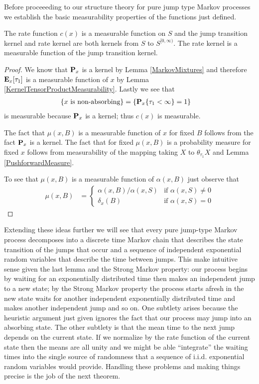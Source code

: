 Before proceeeding to our structure theory for pure jump type Markov
processes we establish the basic measurability properties of the
functions just defined.
\begin{lem}\label{MeasurabilityRateKernel}The rate function $c(x)$ is a measurable function on $S$
  and the jump transition kernel and rate kernel are both kernels from
  $S$ to $S^{[0,\infty)}$.  The rate kernel is a measurable function
  of the jump transition kernel.
\end{lem}
\begin{proof}
We know that $\probabilityop_x$ is a kernel by Lemma
\ref{MarkovMixtures} and therefore $\sexpectation{\tau_1}{x}$ is a
measurable function of $x$ by Lemma
\ref{KernelTensorProductMeasurability}.  Lastly we see that 
\begin{align*}
\lbrace x \text{ is non-absorbing} \rbrace &= \lbrace \sprobability{\tau_1 <
  \infty}{x} = 1 \rbrace
\end{align*}
is measurable because $\probabilityop_x$ is a kernel; thus $c(x)$ is measurable.

The fact that $\mu(x,B)$ is a measurable function of $x$ for fixed $B$
follows from the fact $\probabilityop_x$ is a kernel.  The fact that
for fixed $\mu(x,B)$ is a probability measure for fixed $x$ follows
from measurability of the mapping taking $X$ to $\theta_{\tau_1}X$ and
Lemma \ref{PushforwardMeasure}.

To see that $\mu(x,B)$ is a measurable function of $\alpha(x,B)$ just
observe that 
\begin{align*}
\mu(x,B) &= \begin{cases}
\alpha(x,B)/\alpha(x, S) & \text{if $\alpha(x, S)
  \neq 0$} \\
\delta_x(B) & \text{if $\alpha(x, S) = 0$}
\end{cases}
\end{align*}
\end{proof}

Extending these ideas further we will see that every pure jump-type Markov
process decomposes into a discrete time Markov chain that describes
the state transition of the jumps that occur and a sequence of independent exponential random
variables that describe the time between jumps.   This make intuitive sense given the
last lemma and the Strong Markov property: our process begins by
waiting for an exponentially distributed time then makes an
independent jump to a new state; by the Strong Markov property the
process starts afresh in the new state waits for another independent
exponentially distributed time and makes another independent jump and
so on. 
One subtlety arises because the heuristic argument just given
ignores the fact that our process may jump into an absorbing state.
The other subtlety is that the mean time to the next jump depends on
the current state.  If we normalize by the rate function of the
current state then the means are all unity and we might be able
``integrate'' the waiting times into the single source of randomness
that a sequence of i.i.d. exponential random variables would provide.
Handling these problems and making things precise is the job of the
next theorem.

